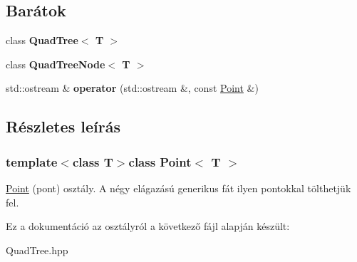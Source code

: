 \subsection*{Barátok}
\begin{DoxyCompactItemize}
\item 
\hypertarget{class_point_a86cf92e1bfbee775eead8ccd7dbdc1f8}{class {\bfseries Quad\-Tree$<$ T $>$}}\label{class_point_a86cf92e1bfbee775eead8ccd7dbdc1f8}

\item 
\hypertarget{class_point_ac17a5caf43217c772028859f0dd9036e}{class {\bfseries Quad\-Tree\-Node$<$ T $>$}}\label{class_point_ac17a5caf43217c772028859f0dd9036e}

\item 
\hypertarget{class_point_a7ac667276b1cffd66906f337de0b9fba}{std\-::ostream \& {\bfseries operator} (std\-::ostream \&, const \hyperlink{class_point}{Point} \&)}\label{class_point_a7ac667276b1cffd66906f337de0b9fba}

\end{DoxyCompactItemize}


\subsection{Részletes leírás}
\subsubsection*{template$<$class T$>$class Point$<$ T $>$}

\hyperlink{class_point}{Point} (pont) osztály. A négy elágazású generikus fát ilyen pontokkal tölthetjük fel. 

Ez a dokumentáció az osztályról a következő fájl alapján készült\-:\begin{DoxyCompactItemize}
\item 
Quad\-Tree.\-hpp\end{DoxyCompactItemize}
